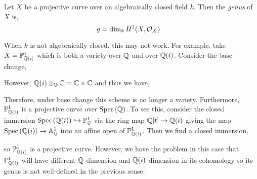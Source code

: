 \documentclass[12pt]{article}
\begin{document}
\section{}

\begin{definition}
Let $X$ be a projective curve over an algebraically closed field $k$. Then the \textit{genus} of $X$ is,
\[ g = \dim_k H^1(X, \mathcal{O}_{X}) \]
\end{definition}

\renewcommand{\C}{\mathbb{C}}

\begin{example}
When $k$ is not algebraically closed, this may not work. For example, take $X = \mathbb{P}^1_{\mathbb{Q}(i)}$ which is both a variety over $\mathbb{Q}$ and over $\mathbb{Q}(i)$. Consider the base change,
\begin{center}
\end{center}
However, $\Q(i) \otimes_\Q \C = \C \times \C$ and thus we have,
\begin{center}
\end{center}
Therefore, under base change this scheme is no longer a variety. Furthermore, $\mathbb{P}^1_{\mathbb{Q}(i)}$ is a projective curve over $\mathrm{Spec}\left( \mathbb{Q} \right)$. To see this, consider the closed immersion $\mathrm{Spec}\left( \mathbb{Q}(i) \right) \hookrightarrow \mathbb{P}^1_{\mathbb{Q}}$ via the ring map $\mathbb{Q}[t] \to \mathbb{Q}(i)$ giving the map $\mathrm{Spec}\left( \mathbb{Q}(i) \right) \to \mathbb{A}^1_{\mathbb{Q}}$ into an affine open of $\mathbb{P}^1_{\mathbb{Q}(i)}$. Then we find a closed immersion,
\begin{center}
\end{center}
so $\mathbb{P}^1_{\mathbb{Q}(i)}$ is a projective curve. However, we have the problem in this case that $\mathbb{P}^1_{\mathbb{Q}(i)}$ will have different $\mathbb{Q}$-dimension and $\mathbb{Q}(i)$-dimension in its cohomology so its genus is not well-defined in the previous sense. 
\end{example}
\end{document}
